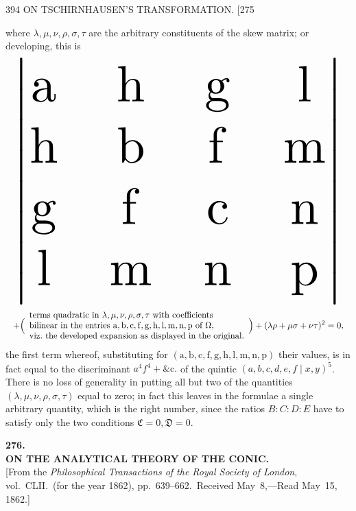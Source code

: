 \documentclass[11pt]{article}
\begin{document}
\begin{center}
394 \hfill ON TSCHIRNHAUSEN'S TRANSFORMATION. \hfill \textsc{[275}
\end{center}

where $\lambda,\mu,\nu,\rho,\sigma,\tau$ are the arbitrary constituents of the skew matrix; or
developing, this is
\[ \resizebox{\textwidth}{!}{$\displaystyle
\begin{vmatrix}
\mathrm{a} & \mathrm{h} & \mathrm{g} & \mathrm{l}\\
\mathrm{h} & \mathrm{b} & \mathrm{f} & \mathrm{m}\\
\mathrm{g} & \mathrm{f} & \mathrm{c} & \mathrm{n}\\
\mathrm{l} & \mathrm{m} & \mathrm{n} & \mathrm{p}
\end{vmatrix}
$} \]
\[ \resizebox{\textwidth}{!}{$\displaystyle
+\Bigl(
\begin{array}{l}
\text{terms quadratic in }\lambda,\mu,\nu,\rho,\sigma,\tau\text{ with coefficients}\\
\text{bilinear in the entries }\mathrm{a,b,c,f,g,h,l,m,n,p}\text{ of }\Omega,\\
\text{viz.\ the developed expansion as displayed in the original.}
\end{array}
\Bigr)+(\lambda\rho+\mu\sigma+\nu\tau)^{2}=0,
$} \]
the first term whereof, substituting for $(\mathrm{a},\mathrm{b},\mathrm{c},\mathrm{f},\mathrm{g},\mathrm{h},\mathrm{l},\mathrm{m},\mathrm{n},\mathrm{p})$ their values, is in
fact equal to the discriminant $a^{4}f^{4}+\&\mathrm{c}.$ of the quintic $(a,b,c,d,e,f \mid x,y)^{5}$. There
is no loss of generality in putting all but two of the quantities $(\lambda,\mu,\nu,\rho,\sigma,\tau)$
equal to zero; in fact this leaves in the formulae a single arbitrary quantity, which
is the right number, since the ratios $B:C:D:E$ have to satisfy only the two
conditions $\mathfrak{C}=0,\mathfrak{D}=0$.


\bigskip

\begin{center}
\textbf{\large 276.}\\[0.6em]
\textbf{\large ON THE ANALYTICAL THEORY OF THE CONIC.}\\[0.4em]
{\small [From the \emph{Philosophical Transactions of the Royal Society of London},
vol.~CLII.\ (for the year 1862), pp.~639--662.\ Received May~8,---Read May~15, 1862.]}
\end{center}
\end{document}

